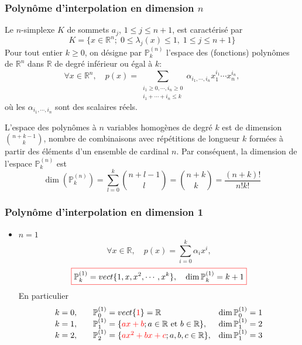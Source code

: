 \documentclass{beamer}
\newcommand{\myredbox}[1]{\fcolorbox{red}{white}{$\displaystyle#1$}}
\begin{document}

\begin{frame}
\frametitle{Polynôme d'interpolation en dimension $n$}

Le $n$-simplexe $K$ de sommets $a_j$, $1\leq j\leq n+1$, est caractérisé par
\begin{equation}
K=\{x\in \mathbb{R}^n;\;0\leq \lambda_j(x) \leq 1,\; 1\leq j\leq n+1\}
\end{equation}
Pour tout entier   $k\geq 0$,  on désigne par $\mathbb{P}_k^{(n)}$ l'espace des (fonctions) polynômes de $\mathbb{R}^n$ dans $\mathbb{R}$ de degré inférieur ou égal à $k$:
\begin{equation}
\forall x\in\mathbb{R}^n,\quad p(x)=\sum_{\begin{array}{c} i_1\geq 0,\cdots ,i_n\geq 0\\i_1+\cdots +i_n\leq k \end{array}}\alpha_{i_1,\cdots,i_n}x_1^{i_1}\cdots x_n^{i_n},
\end{equation}
où les $\alpha_{i_1,\cdots,i_n}$  sont des scalaires réels.

  L'espace des polynômes à $n$ variables homogènes de degré $k$ est de dimension 
$\binom {n+k-1}k$, nombre de combinaisons avec répétitions de longueur $k$ formées à partir des éléments d'un ensemble de cardinal $n$. Par conséquent, la dimension de l'espace $\mathbb{P}_k^{(n)}$ est
\begin{equation}
\dim(\mathbb{P}_k^{(n)})=\sum_{l=0}^k \binom {n+l-1}l=\binom {n+k}k=\frac{(n+k)!}{n!k!}
\end{equation}
\end{frame}


\begin{frame}
\frametitle{Polynôme d'interpolation en dimension 1}

\begin{itemize}
\item $n=1$
\[
\forall x\in\mathbb{R},\quad p(x)=\sum_{i=0}^k\alpha_{i}x^{i},
\]
\[\myredbox{\mathbb{P}_k^{(1)}=vect\{1,x,x^2,\cdots,x^k\},\quad \dim \mathbb{P}_k^{(1)}=k+1}\]
En particulier
\[\begin{array}{lll}
k=0,\quad & \mathbb{P}_0^{(1)}=vect\{{\color{red} 1}\}=\mathbb{R}  & \dim \mathbb{P}_0^{(1)}=1\\
k=1, & \mathbb{P}_1^{(1)}=\{{\color{red}ax+b}; a\in\mathbb{R}\mbox{ et }b\in\mathbb{R}\}, & \dim \mathbb{P}_1^{(1)}=2 \\
k=2, & \mathbb{P}_2^{(1)}=\{{\color{red}ax^2+bx+c}; a,b,c\in\mathbb{R}\}, & \dim \mathbb{P}_1^{(1)}=3
\end{array}  \]

\end{itemize}

\end{frame}
\end{document}
